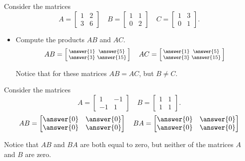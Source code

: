 \documentclass{ximera}
\begin{document}
\begin{exercise}
    Consider the matrices
    \begin{equation*}
        A = \begin{bmatrix} 1 & 2 \\ 3 & 6 \end{bmatrix} \quad B = \begin{bmatrix} 1 & 1 \\ 0 & 2 \end{bmatrix} \quad C = \begin{bmatrix} 1 & 3 \\ 0 & 1 \end{bmatrix}.
    \end{equation*}
    \begin{itemize}
        \item Compute the products $AB$ and $AC$.
        \[
            AB = \left[\begin{smallmatrix}  \answer{1} & \answer{5} \\ \answer{3} & \answer{15} \end{smallmatrix}\right] \quad AC = \left[\begin{smallmatrix}  \answer{1} & \answer{5} \\ \answer{3} & \answer{15} \end{smallmatrix}\right]
        \]
        \begin{feedback}[correct]
            Notice that for these matrices $AB = AC$, but $B \neq C$.
        \end{feedback}
    \end{itemize}
\end{exercise}

\begin{exercise}
    Consider the matrices
    \begin{equation*}
        A = \begin{bmatrix} 1 & -1 \\ -1 & 1 \end{bmatrix} \quad B = \begin{bmatrix} 1 & 1 \\ 1 & 1 \end{bmatrix}.
    \end{equation*}
    \[
        AB = \begin{bmatrix} \answer{0} & \answer{0} \\ \answer{0} & \answer{0} \end{bmatrix} \quad BA = \begin{bmatrix} \answer{0} & \answer{0} \\ \answer{0} & \answer{0} \end{bmatrix}
    \]
    \begin{feedback}[correct]
        Notice that $AB$ and $BA$ are both equal to zero, but neither of the matrices $A$ and $B$ are zero.
    \end{feedback}
\end{exercise}
\end{document}
